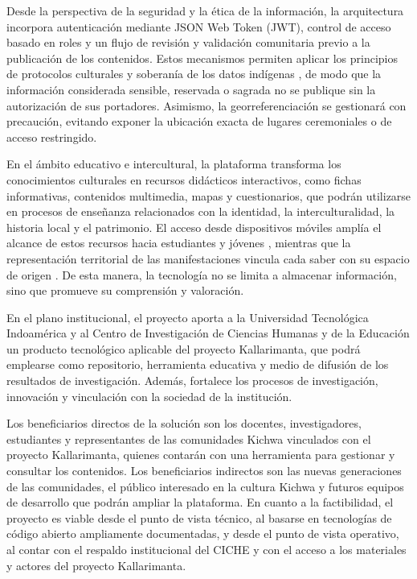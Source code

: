 Desde la perspectiva de la seguridad y la ética de la información, la arquitectura incorpora autenticación mediante JSON Web Token (JWT), control de acceso basado en roles y un flujo de revisión y validación comunitaria previo a la publicación de los contenidos. Estos mecanismos permiten aplicar los principios de protocolos culturales y soberanía de los datos indígenas \cite{christen2012information,hudson2023indigenous}, de modo que la información considerada sensible, reservada o sagrada no se publique sin la autorización de sus portadores. Asimismo, la georreferenciación se gestionará con precaución, evitando exponer la ubicación exacta de lugares ceremoniales o de acceso restringido.

En el ámbito educativo e intercultural, la plataforma transforma los conocimientos culturales en recursos didácticos interactivos, como fichas informativas, contenidos multimedia, mapas y cuestionarios, que podrán utilizarse en procesos de enseñanza relacionados con la identidad, la interculturalidad, la historia local y el patrimonio. El acceso desde dispositivos móviles amplía el alcance de estos recursos hacia estudiantes y jóvenes \cite{sarrab2012mobile}, mientras que la representación territorial de las manifestaciones vincula cada saber con su espacio de origen \cite{gretzel2015smart}. De esta manera, la tecnología no se limita a almacenar información, sino que promueve su comprensión y valoración.

En el plano institucional, el proyecto aporta a la Universidad Tecnológica Indoamérica y al Centro de Investigación de Ciencias Humanas y de la Educación un producto tecnológico aplicable del proyecto Kallarimanta, que podrá emplearse como repositorio, herramienta educativa y medio de difusión de los resultados de investigación. Además, fortalece los procesos de investigación, innovación y vinculación con la sociedad de la institución.

Los beneficiarios directos de la solución son los docentes, investigadores, estudiantes y representantes de las comunidades Kichwa vinculados con el proyecto Kallarimanta, quienes contarán con una herramienta para gestionar y consultar los contenidos. Los beneficiarios indirectos son las nuevas generaciones de las comunidades, el público interesado en la cultura Kichwa y futuros equipos de desarrollo que podrán ampliar la plataforma. En cuanto a la factibilidad, el proyecto es viable desde el punto de vista técnico, al basarse en tecnologías de código abierto ampliamente documentadas, y desde el punto de vista operativo, al contar con el respaldo institucional del CICHE y con el acceso a los materiales y actores del proyecto Kallarimanta.

